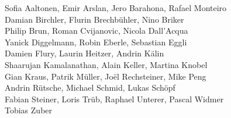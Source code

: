 %
%
%
Sofia Aaltonen,		%
Emir Arslan, 		%
Jero Barahona,		%
Rafael Monteiro%
\\
Damian Birchler,	%
Flurin Brechbühler,	%
Nino Briker%
\\
Philip Brun,		%
Roman Cvijanovic,	%
Nicola Dall'Acqua%
\\
Yanick Diggelmann,	%
Robin Eberle,		%
Sebastian Eggli%
\\
Damien Flury,		%
Laurin Heitzer,		%
Andrin Kälin%
\\
Shaarujan Kamalanathan,	%
Alain Keller,		%
Martina Knobel%
\\
Gian Kraus,		%
Patrik Müller,		%
Joël Rechsteiner,	%
Mike Peng%
\\
Andrin Rütsche,		%
Michael Schmid,		%
Lukas Schöpf%
\\
Fabian Steiner,		%
Loris Trüb,		%
Raphael Unterer,	%
Pascal Widmer%
\\
Tobias Zuber%
\\
